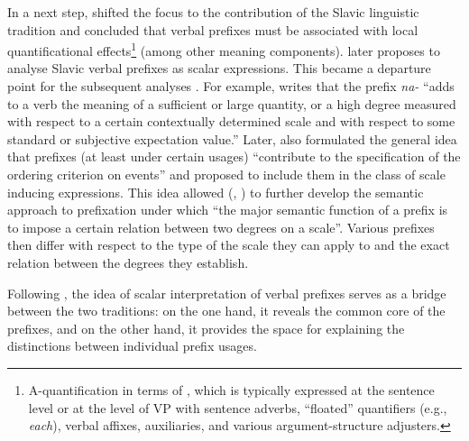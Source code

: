 In a next step, \citet{Filip:92} shifted the focus to the contribution of the Slavic linguistic tradition \citep{Wierzbicka:67, Rassudova:75, Merrill:85} and concluded that verbal prefixes must be associated with local quantificational effects\footnote{A-quantification in terms of \citealt{BachPartee:87, BachPartee:95}, which is typically expressed at the sentence level or at the level of VP with sentence adverbs, ``floated'' quantifiers (e.g., \textit{each}), verbal affixes, auxiliaries, and various argument-structure adjusters.} (among other meaning components). \citet{Filip:99} later proposes to analyse Slavic verbal prefixes as scalar expressions. This became a departure point for the subsequent analyses \citep{Filip:00, Filip:03, Filip:05, FilipRothstein:05, Kagan:11, Kagan:12, Kagan:13, Kagan:book}. For example, \citet[183]{Filip:99} writes that the prefix \textit{na-}   ``adds to a verb the meaning of a sufficient or large quantity, or a high degree measured with respect to a certain contextually determined scale and with respect to some standard or subjective expectation value.'' Later, \citet{Filip:08} also formulated the general idea that prefixes (at least under certain usages) ``contribute to the specification of the ordering criterion on events'' and proposed to include them in the class of scale inducing expressions. This idea allowed \citeauthor{Kagan:12} (\citeyear{Kagan:12}, \citeyear{Kagan:book}) to further develop the semantic approach to prefixation  under which ``the major semantic function of a prefix is to impose a certain relation between two degrees on a scale''. Various prefixes then differ with respect to the type of the scale they can apply to and the exact relation between the degrees  they establish. 

Following \citet{Filip:08}, the idea of scalar interpretation of verbal prefixes serves as a bridge between the two traditions: on the one hand, it reveals the common core of the prefixes, and on the other hand, it provides the space for explaining the distinctions between individual prefix usages. 

